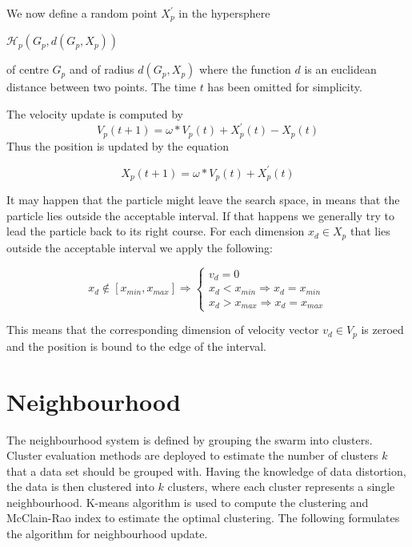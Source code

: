 \documentclass{mini}
\begin{document}
We now define a random point $X^{'}_p$ in the hypersphere
\begin{center}
    $\mathcal{H}_p(G_p, d(G_p, X_p))$ 
\end{center}
of centre $G_p$ and of radius $d(G_p, X_p)$ where the function $d$ is an euclidean distance between two points. The time $t$ has been omitted for simplicity.

The velocity update is computed by
\begin{equation}
    V_p(t+1) = \omega * V_p(t) + X^{'}_p(t) - X_p(t)
\end{equation}
Thus the position is updated by the equation

\begin{equation}
    X_p(t+1) = \omega * V_p(t) + X^{'}_p(t)
\end{equation}


It may happen that the particle might leave the search space, in means that the particle lies outside the acceptable interval. If that happens we generally try to lead the particle back to its right course. For each dimension $x_{d} \in X_p$ that lies  outside the acceptable interval we apply the following:

\[
x_{d} \notin [x_{min}, x_{max}] \Rightarrow \left \{
\begin{array}{ll}
v_{d} = 0 \\
x_d < x_{min} \Rightarrow x_d = x_{min} \\
x_d > x_{max} \Rightarrow x_d = x_{max}
\end{array}
\right.
\]

This means that the corresponding dimension of velocity vector $v_d \in V_p$ is zeroed and the position is bound to the edge of the interval.


\section{Neighbourhood}
The neighbourhood system is defined by grouping the swarm into clusters. Cluster evaluation methods are deployed to estimate the number of clusters $k$ that a data set should be grouped with. Having the knowledge of data distortion, the data is then clustered into $k$ clusters, where each cluster represents a single neighbourhood. K-means algorithm is used to compute the clustering and McClain-Rao index to estimate the optimal clustering. The following formulates the algorithm for neighbourhood update.
\end{document}
